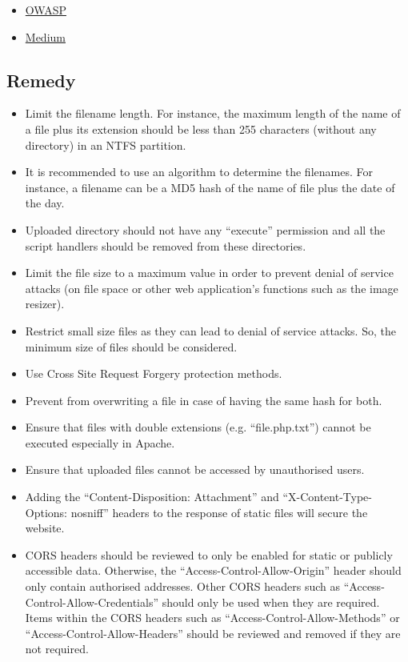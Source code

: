 \begin{itemize}
    \item \href{https://owasp.org/www-community/vulnerabilities/Unrestricted_File_Upload}{OWASP}
    \item \href{https://medium.com/@petehouston/upload-files-with-curl-93064dcccc76}{Medium}
\end{itemize}

\subsection{Remedy}

\begin{itemize}
    \item Limit the filename length. For instance, the maximum length of the name of a file plus its extension should be less than 255 characters (without any directory) in an NTFS partition.
    \item It is recommended to use an algorithm to determine the filenames. For instance, a filename can be a MD5 hash of the name of file plus the date of the day.
    \item Uploaded directory should not have any “execute” permission and all the script handlers should be removed from these directories.
    \item Limit the file size to a maximum value in order to prevent denial of service attacks (on file space or other web application’s functions such as the image resizer).
    \item Restrict small size files as they can lead to denial of service attacks. So, the minimum size of files should be considered.
    \item Use Cross Site Request Forgery protection methods.
    \item Prevent from overwriting a file in case of having the same hash for both.
    \item Ensure that files with double extensions (e.g. “file.php.txt”) cannot be executed especially in Apache.
    \item Ensure that uploaded files cannot be accessed by unauthorised users.
    \item Adding the “Content-Disposition: Attachment” and “X-Content-Type-Options: nosniff” headers to the response of static files will secure the website.
    \item CORS headers should be reviewed to only be enabled for static or publicly accessible data. Otherwise, the “Access-Control-Allow-Origin” header should only contain authorised addresses. Other CORS headers such as “Access-Control-Allow-Credentials” should only be used when they are required. Items within the CORS headers such as “Access-Control-Allow-Methods” or “Access-Control-Allow-Headers” should be reviewed and removed if they are not required.
\end{itemize}
